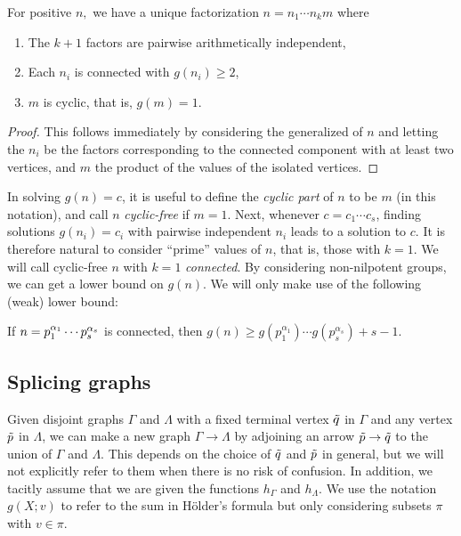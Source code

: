 \begin{prop}
	For positive $n,$ we have a unique factorization $n = n_1 \cdots n_k m$ where\pagebreak[3]
	\begin{enumerate} \listspace
		\item The $k + 1$ factors are pairwise arithmetically independent,
		\item Each $n_i$ is connected with $g(n_i) \ge 2$,
		\item $m$ is cyclic, that is, $g(m) = 1$.
	\end{enumerate} \textspace
\end{prop}
\begin{proof}
	This follows immediately by considering the generalized  of $n$ and letting the $n_i$ be the factors corresponding to the connected component with at least two vertices, and $m$ the product of the values of the isolated vertices.
\end{proof}

In solving $g(n) = c$, it is useful to define the \emph{cyclic part} of $n$ to be $m$ (in this notation), and call $n$ \emph{cyclic-free} if $m = 1$. Next, whenever $c = c_1 \cdots c_s$, finding solutions $g(n_i) = c_i$ with pairwise independent $n_i$ leads to a solution to $c$. It is therefore natural to consider ``prime'' values of $n$, that is, those with $k = 1$. We will call cyclic-free $n$ with $k = 1$ \emph{connected}. By considering non-nilpotent groups, we can get a lower bound on $g(n)$. We will only make use of the following (weak) lower bound:

\begin{prop}
	If $n = p_1^{\alpha_1} \cdots p_s^{\alpha_s}$ is connected, then $g(n) \ge g(p_1^{\alpha_1})\cdots g(p_s^{\alpha_s}) + s - 1.$
\end{prop}

\subsection{Splicing graphs}
Given disjoint graphs $\Gamma$ and $\Lambda$ with a fixed terminal vertex $\tilde{q}$ in $\Gamma$ and any vertex $\tilde{p}$ in $\Lambda$, we can make a new graph $\Gamma \rightarrow \Lambda$ by adjoining an arrow $\tilde{p} \rightarrow \tilde{q}$ to the union of $\Gamma$ and $\Lambda$. This depends on the choice of $\tilde{q}$ and $\tilde{p}$ in general, but we will not explicitly refer to them when there is no risk of confusion. In addition, we tacitly assume that we are given the functions $h_\Gamma$ and $h_\Lambda$. We use the notation $g(X; v)$ to refer to the sum in Hölder's formula but only considering subsets $\pi$ with $v \in \pi$.

